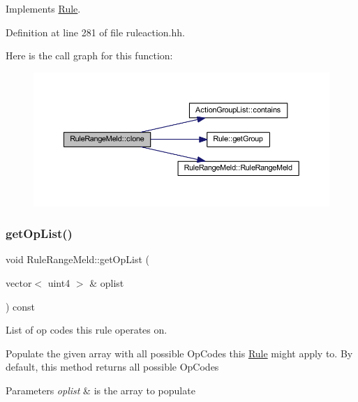 Implements \mbox{\hyperlink{class_rule_a70de90a76461bfa7ea0b575ce3c11e4d}{Rule}}.



Definition at line 281 of file ruleaction.\+hh.

Here is the call graph for this function\+:
\nopagebreak
\begin{figure}[H]
\begin{center}
\leavevmode
\includegraphics[width=350pt]{class_rule_range_meld_a3d44e55b0b5ac831e649bb220ffa8342_cgraph}
\end{center}
\end{figure}
\mbox{\label{class_rule_range_meld_a2ab026b0fd6678141add434965eb1353}} 
\subsubsection{\texorpdfstring{getOpList()}{getOpList()}}
{\footnotesize\ttfamily void Rule\+Range\+Meld\+::get\+Op\+List (\begin{DoxyParamCaption}\item[{vector$<$ uint4 $>$ \&}]{oplist }\end{DoxyParamCaption}) const\hspace{0.3cm}{\ttfamily [virtual]}}



List of op codes this rule operates on. 

Populate the given array with all possible Op\+Codes this \mbox{\hyperlink{class_rule}{Rule}} might apply to. By default, this method returns all possible Op\+Codes 
\begin{DoxyParams}{Parameters}
{\em oplist} & is the array to populate \\
\hline
\end{DoxyParams}


